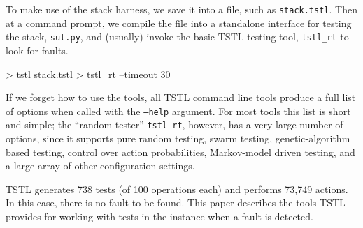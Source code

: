 To make use of the stack harness, we save it into a file, such
as {\tt stack.tstl}.  Then at a command prompt, we compile the file into
a standalone interface for testing the stack, {\tt sut.py}, and
(usually) invoke the basic TSTL testing tool, {\tt tstl\_rt} to look for faults.

{\scriptsize
\begin{code}
 > tstl stack.tstl
 > tstl\_rt --timeout 30
\end{code}
}

If we forget how to use the tools, all TSTL command line tools
produce a full list of options when called with the {\tt --help}
argument.  For most tools this list is short and simple; the ``random
tester'' {\tt tstl\_rt}, however, has a very large number of options,
since it supports pure random testing, swarm testing,
genetic-algorithm based testing, control over action probabilities,
Markov-model driven testing, and a large array of other configuration settings.

TSTL generates 738 tests (of 100 operations each) and performs
73,749 actions.  In this case, there is no fault to be found.  This
paper describes the tools TSTL provides for working with tests in the
instance when a fault is detected.

